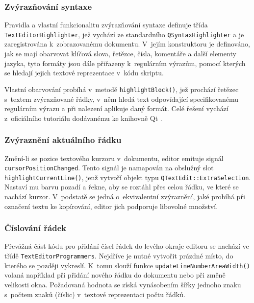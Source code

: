 \documentclass[11pt,twoside,a4paper]{book}
\begin{document}
\subsubsection{Zvýrazňování syntaxe}

Pravidla a vlastní funkcionalitu zvýrazňování syntaxe definuje třída \texttt{Text\-E\-di\-tor\-High\-ligh\-ter}, jež vychází ze standardního \texttt{QSyntaxHighlighter} a je zaregistrována k~zobrazovanému dokumentu. V~jejím konstruktoru je definováno, jak se mají obarvovat klíčová slova, řetězce, čísla, komentáře a další elementy jazyka, tyto formáty jsou dále přiřazeny k~regulárním výrazům, pomocí kterých se hledají jejich textové reprezentace v~kódu skriptu.

Vlastní obarvování probíhá v~metodě \texttt{highlightBlock()}, jež prochází řetězec s~textem zvýrazňované řádky, v~něm hledá text odpovídající specifikovanému regulárním výrazu a při nalezení aplikuje daný formát. Celé řešení vychází z~oficiálního tutoriálu dodávanému ke knihovně Qt \cite{syntax_highlighter_example}.


\subsubsection{Zvýraznění aktuálního řádku}

Změní-li se pozice textového kurzoru v~dokumentu, editor emituje signál \texttt{cur\-sor\-Po\-si\-ti\-on\-Chan\-ged}. Tento signál je namapován na obslužný slot \texttt{highlightCurrentLine()}, jenž vytvoří objekt typu \texttt{QTextEdit::ExtraSelection}. Nastaví mu barvu pozadí a řekne, aby se roztáhl přes celou řádku, ve které se nachází kurzor. V~podstatě se jedná o~ekvivalentní zvýraznění, jaké probíhá při označení textu ke kopírování, editor jich podporuje libovolné množství.


\subsubsection{Číslování řádek}

Převážná část kódu pro přidání čísel řádek do levého okraje editoru se nachází ve třídě \texttt{TextEditorProgrammers}. Nejdříve je nutné vytvořit prázdné místo, do kterého se později vykreslí. K~tomu slouží funkce \texttt{updateLineNumberAreaWidth()} volaná například při přidání nového řádku do dokumentu nebo při změně velikosti okna. Požadovaná hodnota se získá vynásobením šířky jednoho znaku s~počtem znaků (číslic) v~textové reprezentaci počtu řádků.
\end{document}
